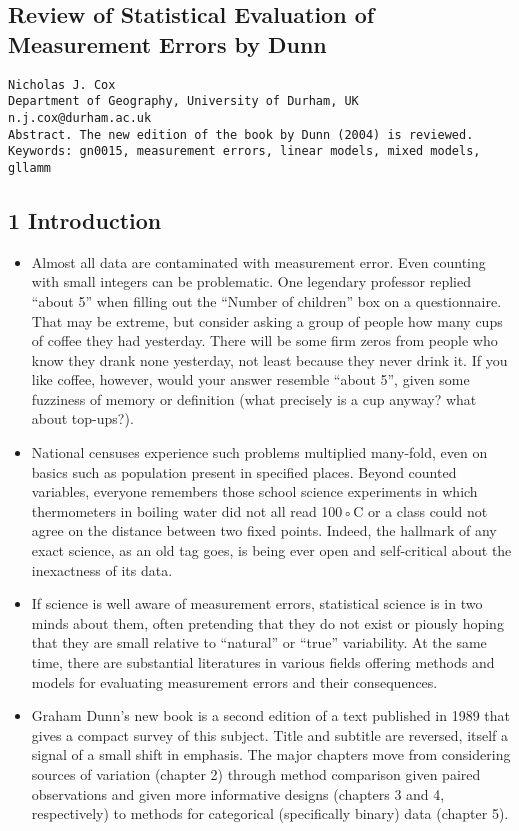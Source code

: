 \subsection{Review of Statistical Evaluation of Measurement Errors by Dunn}
\begin{verbatim}
Nicholas J. Cox
Department of Geography, University of Durham, UK
n.j.cox@durham.ac.uk
Abstract. The new edition of the book by Dunn (2004) is reviewed.
Keywords: gn0015, measurement errors, linear models, mixed models, gllamm
\end{verbatim}

\subsection{1 Introduction}

\begin{itemize}

\item Almost all data are contaminated with measurement error. Even counting with small
integers can be problematic. One legendary professor replied “about 5” when filling out
the “Number of children” box on a questionnaire. That may be extreme, but consider
asking a group of people how many cups of coffee they had yesterday. There will be
some firm zeros from people who know they drank none yesterday, not least because
they never drink it. If you like coffee, however, would your answer resemble “about 5”,
given some fuzziness of memory or definition (what precisely is a cup anyway? what
about top-ups?). 
\item National censuses experience such problems multiplied many-fold,
even on basics such as population present in specified places. Beyond counted variables,
everyone remembers those school science experiments in which thermometers in boiling
water did not all read 100◦C or a class could not agree on the distance between two
fixed points. Indeed, the hallmark of any exact science, as an old tag goes, is being ever
open and self-critical about the inexactness of its data.
\item If science is well aware of measurement errors, statistical science is in two minds
about them, often pretending that they do not exist or piously hoping that they are
small relative to “natural” or “true” variability. At the same time, there are substantial
literatures in various fields offering methods and models for evaluating measurement
errors and their consequences. 
\item Graham Dunn’s new book is a second edition of a text
published in 1989 that gives a compact survey of this subject. Title and subtitle are
reversed, itself a signal of a small shift in emphasis. The major chapters move from
considering sources of variation (chapter 2) through method comparison given paired
observations and given more informative designs (chapters 3 and 4, respectively) to
methods for categorical (specifically binary) data (chapter 5).

\end{itemize}

